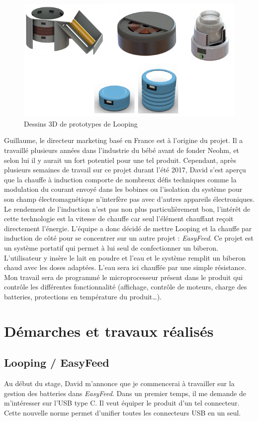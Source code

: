 \documentclass[a4paper, 12pt, sffamily]{report}
\begin{document}
\begin{figure}[H]
\centering
\includegraphics[scale=0.75]{figures/screenshots/3D_drawing_looping.png}
\caption{Dessins 3D de prototypes de Looping}
\label{fig:3D_looping}
\end{figure}

Guillaume, le directeur marketing basé en France est à l’origine du projet. Il a travaillé plusieurs années dans l’industrie du bébé avant de fonder Neohm, et selon lui il y aurait un fort potentiel pour une tel produit.
Cependant, après plusieurs semaines de travail sur ce projet durant l’été 2017, David s’est aperçu que la chauffe à induction comporte de nombreux défis techniques comme la modulation du courant envoyé dans les bobines ou l’isolation du système pour son champ électromagnétique n’interfère pas avec d’autres appareils électroniques. Le rendement de l’induction n’est pas non plus particulièrement bon, l’intérêt de cette technologie est la vitesse de chauffe car seul l’élément chauffant reçoit directement l’énergie.
L’équipe a donc décidé de mettre Looping et la chauffe par induction de côté pour se concentrer sur un autre projet : \emph{EasyFeed}. Ce projet est un système portatif qui permet à lui seul de confectionner un biberon. L’utilisateur y insère le lait en poudre et l’eau et le système remplit un biberon chaud avec les doses adaptées. L’eau sera ici chauffée par une simple résistance.
Mon travail sera de programmé le microprocesseur présent dans le produit qui contrôle les différentes fonctionnalité (affichage, contrôle de moteurs, charge des batteries, protections en température du produit…).

\chapter{Démarches et travaux réalisés}
\section{Looping / EasyFeed}
Au début du stage, David m’annonce que je commencerai à travailler sur la gestion des batteries dans \emph{EasyFeed}.
Dans un premier temps, il me demande de m’intéresser sur l’USB type C. Il veut équiper le produit d’un tel connecteur. Cette nouvelle norme permet d’unifier toutes les connecteurs USB en un seul.
\end{document}
